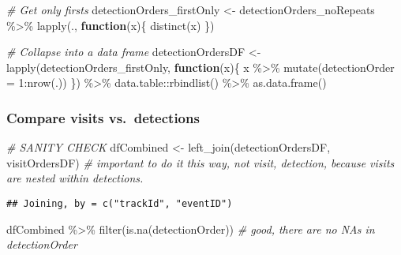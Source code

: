 \documentclass[
]{article}
\newenvironment{Shaded}{\begin{snugshade}}{\end{snugshade}}
\newcommand{\AttributeTok}[1]{\textcolor[rgb]{0.77,0.63,0.00}{#1}}
\newcommand{\CommentTok}[1]{\textcolor[rgb]{0.56,0.35,0.01}{\textit{#1}}}
\newcommand{\ControlFlowTok}[1]{\textcolor[rgb]{0.13,0.29,0.53}{\textbf{#1}}}
\newcommand{\DecValTok}[1]{\textcolor[rgb]{0.00,0.00,0.81}{#1}}
\newcommand{\FunctionTok}[1]{\textcolor[rgb]{0.00,0.00,0.00}{#1}}
\newcommand{\NormalTok}[1]{#1}
\newcommand{\OtherTok}[1]{\textcolor[rgb]{0.56,0.35,0.01}{#1}}
\newcommand{\SpecialCharTok}[1]{\textcolor[rgb]{0.00,0.00,0.00}{#1}}
\begin{document}
\begin{Shaded}
\begin{Highlighting}[]
\CommentTok{\# Get only firsts}
\NormalTok{detectionOrders\_firstOnly }\OtherTok{\textless{}{-}}\NormalTok{ detectionOrders\_noRepeats }\SpecialCharTok{\%\textgreater{}\%}
  \FunctionTok{lapply}\NormalTok{(., }\ControlFlowTok{function}\NormalTok{(x)\{}
    \FunctionTok{distinct}\NormalTok{(x)}
\NormalTok{  \})}

\CommentTok{\# Collapse into a data frame}
\NormalTok{detectionOrdersDF }\OtherTok{\textless{}{-}} \FunctionTok{lapply}\NormalTok{(detectionOrders\_firstOnly, }\ControlFlowTok{function}\NormalTok{(x)\{}
\NormalTok{  x }\SpecialCharTok{\%\textgreater{}\%} \FunctionTok{mutate}\NormalTok{(}\AttributeTok{detectionOrder =} \DecValTok{1}\SpecialCharTok{:}\FunctionTok{nrow}\NormalTok{(.))}
\NormalTok{\}) }\SpecialCharTok{\%\textgreater{}\%}
\NormalTok{  data.table}\SpecialCharTok{::}\FunctionTok{rbindlist}\NormalTok{() }\SpecialCharTok{\%\textgreater{}\%}
  \FunctionTok{as.data.frame}\NormalTok{()}
\end{Highlighting}
\end{Shaded}

\hypertarget{compare-visits-vs.-detections}{%
\subsubsection{Compare visits
vs.~detections}\label{compare-visits-vs.-detections}}

\begin{Shaded}
\begin{Highlighting}[]
\CommentTok{\# SANITY CHECK}
\NormalTok{dfCombined }\OtherTok{\textless{}{-}} \FunctionTok{left\_join}\NormalTok{(detectionOrdersDF, visitOrdersDF) }\CommentTok{\# important to do it this way, not visit, detection, because visits are nested within detections.}
\end{Highlighting}
\end{Shaded}

\begin{verbatim}
## Joining, by = c("trackId", "eventID")
\end{verbatim}

\begin{Shaded}
\begin{Highlighting}[]
\NormalTok{dfCombined }\SpecialCharTok{\%\textgreater{}\%}
  \FunctionTok{filter}\NormalTok{(}\FunctionTok{is.na}\NormalTok{(detectionOrder)) }\CommentTok{\# good, there are no NA\textquotesingle{}s in detectionOrder}
\end{Highlighting}
\end{Shaded}
\end{document}
